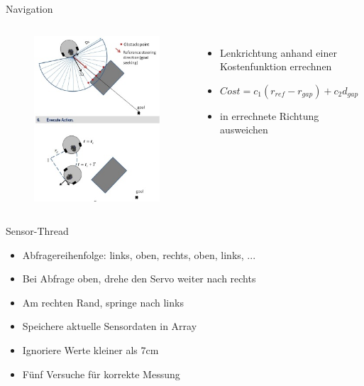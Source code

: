 \begin{frame}{Navigation}
\begin{columns}
\column{0.49\paperwidth}
\vspace{-0.5cm}
\begin{figure}
\center
\includegraphics[height=.85\textheight]{Plots/navigation2}
\end{figure}
\column{0.49\paperwidth}
\begin{itemize}
\item Lenkrichtung anhand einer Kostenfunktion errechnen
\item $Cost = c_1 (r_{ref} - r_{gap}) + c_2 d_{gap}$
\\[1cm]
\item in errechnete Richtung ausweichen
\end{itemize}
\end{columns}
\end{frame}

\begin{frame}{Sensor-Thread}
\begin{itemize}
\item Abfragereihenfolge: links, oben, rechts, oben, links, ...
\item Bei Abfrage oben, drehe den Servo weiter nach rechts
\item Am rechten Rand, springe nach links \\[0.5cm]
\item Speichere aktuelle Sensordaten in Array
\item Ignoriere Werte kleiner als 7cm
\item Fünf Versuche für korrekte Messung
\end{itemize}
\end{frame}


